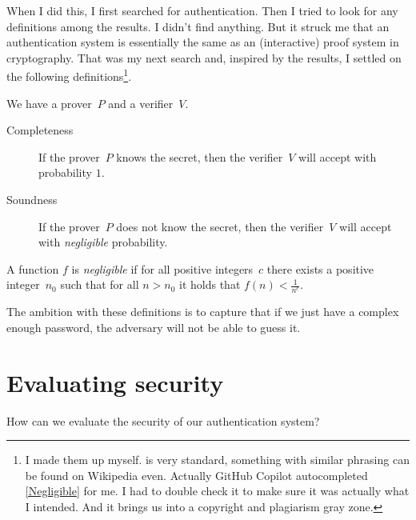 When I did this, I first searched for authentication.
Then I tried to look for any definitions among the results.
I didn't find anything.
But it struck me that an authentication system is essentially the same as an 
(interactive) proof system in cryptography.
That was my next search and, inspired by the results, I settled on the 
following definitions\footnote{%
   I made them up myself.
   is very standard, something with similar phrasing can be 
  found on Wikipedia even.
  Actually GitHub Copilot autocompleted \cref{Negligible} for me.
  I had to double check it to make sure it was actually what I intended.
  And it brings us into a copyright and plagiarism gray zone.
}.

\begin{frame}
\begin{definition}\label{FormalSecurity}
  We have a prover~\(P\) and a verifier~\(V\).
  \begin{description}
    \item[Completeness] If the prover~\(P\) knows the secret, then the 
      verifier~\(V\) will accept with probability \(1\).
    \item[Soundness] If the prover~\(P\) does not know the secret, then the 
      verifier~\(V\) will accept with \emph{negligible} probability.
  \end{description}
\end{definition}

\begin{definition}[Negligible]\label{Negligible}
  A function \(f\) is \emph{negligible} if for all positive integers~\(c\) 
  there exists a positive integer~\(n_0\) such that for all \(n > n_0\) it 
  holds that \(f(n) < \frac{1}{n^c}\).
\end{definition}
\end{frame}

The ambition with these definitions is to capture that if we just have a 
complex enough password, the adversary will not be able to guess it.


\section{Evaluating security}

\begin{frame}
  \begin{exercise}
    How can we evaluate the security of our authentication system?
  \end{exercise}
\end{frame}

